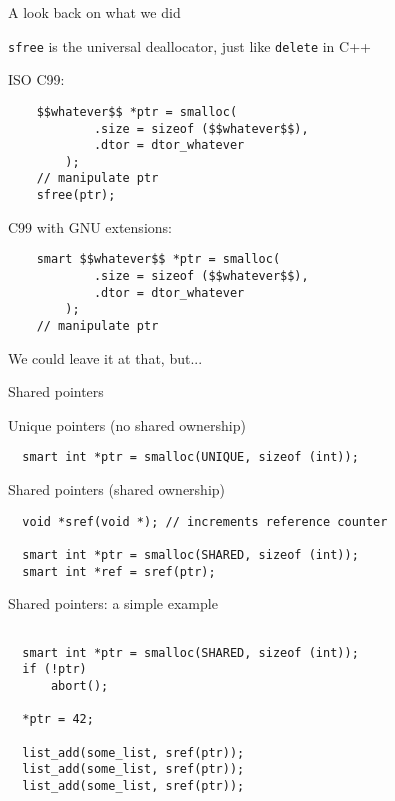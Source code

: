 \documentclass[10pt]{beamer}
\begin{document}

\begin{frame}[fragile]{A look back on what we did}

    \verb|sfree| is the universal deallocator, just like \verb|delete| in C++

    ISO C99:
    \begin{lstlisting}
    $$whatever$$ *ptr = smalloc(
            .size = sizeof ($$whatever$$),
            .dtor = dtor_whatever
        );
    // manipulate ptr
    sfree(ptr);
    \end{lstlisting}

    C99 with GNU extensions:
    \begin{lstlisting}
    smart $$whatever$$ *ptr = smalloc(
            .size = sizeof ($$whatever$$),
            .dtor = dtor_whatever
        );
    // manipulate ptr
    \end{lstlisting}

    We could leave it at that, but...

\end{frame}


\begin{frame}[fragile]{Shared pointers}

    Unique pointers (no shared ownership)
    \begin{lstlisting}
  smart int *ptr = smalloc(UNIQUE, sizeof (int));
    \end{lstlisting}

    Shared pointers (shared ownership)
    \begin{lstlisting}
  void *sref(void *); // increments reference counter

  smart int *ptr = smalloc(SHARED, sizeof (int));
  smart int *ref = sref(ptr);
    \end{lstlisting}

\end{frame}

\begin{frame}[fragile]{Shared pointers: a simple example}

  \begin{lstlisting}

  smart int *ptr = smalloc(SHARED, sizeof (int));
  if (!ptr)
      abort();

  *ptr = 42;

  list_add(some_list, sref(ptr));
  list_add(some_list, sref(ptr));
  list_add(some_list, sref(ptr));

  \end{lstlisting}

\end{frame}
\end{document}

